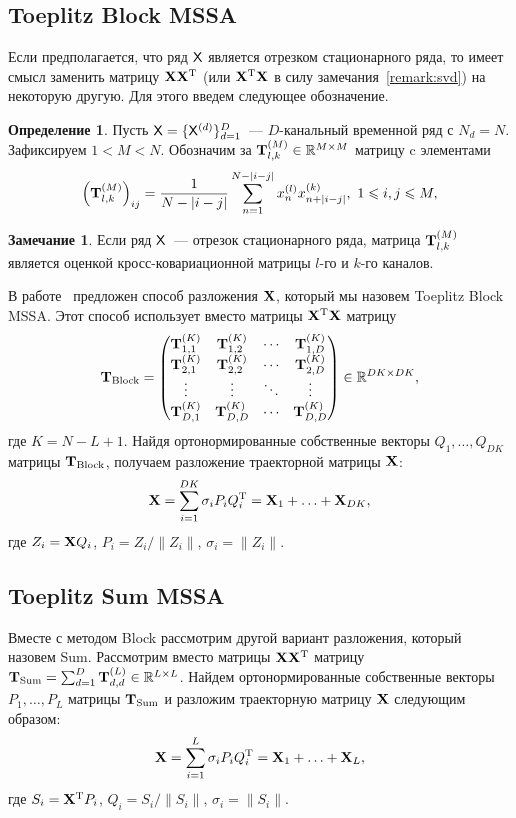 \documentclass[specialist,
substylefile = spbu.rtx,
               subf,href,colorlinks=true,12pt]{disser}
\theoremstyle{definition}
\newtheorem{definition}{Определение}
\newtheorem{remark}{Замечание}
\newcommand{\R}{\mathbb{R}}
\begin{document}
\subsection{Toeplitz Block MSSA}\label{sect:block}
Если предполагается, что ряд $\mathsf{X}$ является отрезком стационарного ряда, то имеет смысл заменить матрицу $\mathbf{X}\mathbf{X}^{\mathrm{T}}$ (или $\mathbf{X}^{\mathrm{T}}\mathbf{X}$ в силу замечания~\ref{remark:svd}) на некоторую другую. Для этого введем следующее обозначение.
\begin{definition}
	Пусть $\mathsf{X}=\{\mathsf{X}^{(d)}\}_{d=1}^D$~--- $D$-канальный временной ряд с $N_d=N$. Зафиксируем $1<M<N$. Обозначим за $\bfT_{l,k}^{(M)}\in \R^{M\times M}$ матрицу c элементами
	\begin{equation*}\label{eq:block_elements}
		\left(\mathbf{T}^{(M)}_{l,k}\right)_{ij}=\frac{1}{N-|i-j|}\sum_{n=1}^{N-|i-j|} x^{(l)}_nx^{(k)}_{n+|i-j|},\ 1\leqslant i,j\leqslant M,
	\end{equation*}
\end{definition}
\begin{remark}
	Если ряд $\mathsf{X}$~--- отрезок стационарного ряда, матрица $\mathbf{T}_{l,k}^{(M)}$ является оценкой кросс-ковариационной матрицы $l$-го и $k$-го каналов.
\end{remark}
В работе~\cite{Plaut1994} предложен способ разложения $\mathbf{X}$, который мы назовем Toeplitz Block MSSA. Этот способ использует вместо матрицы $\mathbf{X}^{\mathrm{T}}\mathbf{X}$ матрицу $$\bfT_{\text{Block}}=\begin{pmatrix}
	\bfT^{(K)}_{1,1} & \bfT^{(K)}_{1,2} & \cdots & \bfT^{(K)}_{1,D} \\
	\bfT^{(K)}_{2,1} & \bfT^{(K)}_{2,2} & \cdots & \bfT^{(K)}_{2,D} \\
	\vdots           & \vdots           & \ddots & \vdots           \\
	\bfT^{(K)}_{D,1} & \bfT^{(K)}_{D,D} & \cdots & \bfT^{(K)}_{D,D}
\end{pmatrix} \in \R^{DK\times DK},$$ где $K = N - L + 1$. Найдя ортонормированные собственные векторы $Q_1,\ldots,Q_{DK}$ матрицы $\mathbf{T}_\text{Block}$, получаем разложение траекторной матрицы $\mathbf{X}$:
\begin{equation}\label{eq:block_decomposition}
	\mathbf{X}=\sum_{i=1}^{DK} \sigma_i P_i Q_i^{\mathrm{T}}=\mathbf{X}_1+\ldots+\mathbf{X}_{DK},
\end{equation}
где $Z_i=\mathbf{X} Q_i$, $P_i=Z_i/\|Z_i\|$, $\sigma_i=\|Z_i\|$.

\subsection{Toeplitz Sum MSSA}\label{sect:sum}
Вместе с методом Block рассмотрим другой вариант разложения, который назовем Sum. Рассмотрим вместо матрицы $\mathbf{X}\mathbf{X}^{\mathrm{T}}$ матрицу $\bfT_{\text{Sum}}=\sum_{d=1}^D \bfT_{d,d}^{(L)}\in\R^{L\times L}$. Найдем ортонормированные собственные векторы $P_1,\ldots,P_L$ матрицы $\mathbf{T}_{\text{Sum}}$ и разложим траекторную матрицу $\mathbf{X}$ следующим образом:
\begin{equation}\label{eq:sum_decomposition}
	\mathbf{X}=\sum_{i=1}^L\sigma_i P_iQ_i^{\mathrm{T}}=\mathbf{X}_1+\ldots+\mathbf{X}_L,
\end{equation}
где $S_i=\mathbf{X}^{\mathrm{T}} P_i$, $Q_i=S_i/\|S_i\|$, $\sigma_i=\|S_i\|$.
\end{document}
